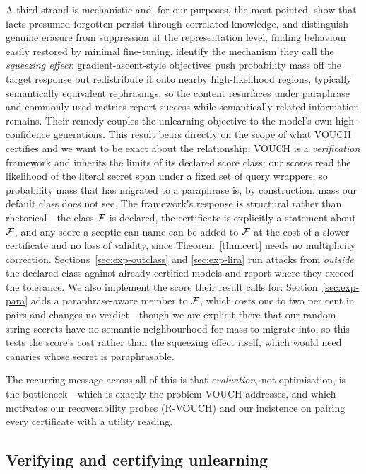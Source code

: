 A third strand is mechanistic and, for our purposes, the most pointed.
\citet{wei2025forget} show that facts presumed forgotten persist through correlated
knowledge, and \citet{xu2026reversibility} distinguish genuine erasure from
suppression at the representation level, finding behaviour easily restored by minimal
fine-tuning. \citet{li2026beliefs} identify the mechanism they call the
\emph{squeezing effect}: gradient-ascent-style objectives push probability mass off
the target response but redistribute it onto nearby high-likelihood regions, typically
semantically equivalent rephrasings, so the content resurfaces under paraphrase and
commonly used metrics report success while semantically related information remains.
Their remedy couples the unlearning objective to the model's own high-confidence
generations. This result bears directly on the scope of what VOUCH certifies and we
want to be exact about the relationship. VOUCH is a \emph{verification} framework and
inherits the limits of its declared score class: our scores read the likelihood of the
literal secret span under a fixed set of query wrappers, so probability mass that has
migrated to a paraphrase is, by construction, mass our default class does not see. The
framework's response is structural rather than rhetorical---the class $\mathcal{F}$ is declared,
the certificate is explicitly a statement about $\mathcal{F}$, and any score a sceptic can name
can be added to $\mathcal{F}$ at the cost of a slower certificate and no loss of validity, since
Theorem~\ref{thm:cert} needs no multiplicity correction. Sections~\ref{sec:exp-outclass} and
\ref{sec:exp-lira} run attacks from \emph{outside} the declared class against
already-certified models and report where they exceed the tolerance. We also
implement the score their result calls for: Section~\ref{sec:exp-para} adds a
paraphrase-aware member to $\mathcal{F}$, which costs one to two per cent in pairs and changes
no verdict---though we are explicit there that our random-string secrets have no
semantic neighbourhood for mass to migrate into, so this tests the score's cost rather
than the squeezing effect itself, which would need canaries whose secret is
paraphrasable.

The recurring message across all of this is that \emph{evaluation}, not optimisation,
is the bottleneck---which is exactly the problem VOUCH addresses, and which motivates
our recoverability probes (R-VOUCH) and our insistence on pairing every certificate
with a utility reading.

\subsection{Verifying and certifying unlearning}


